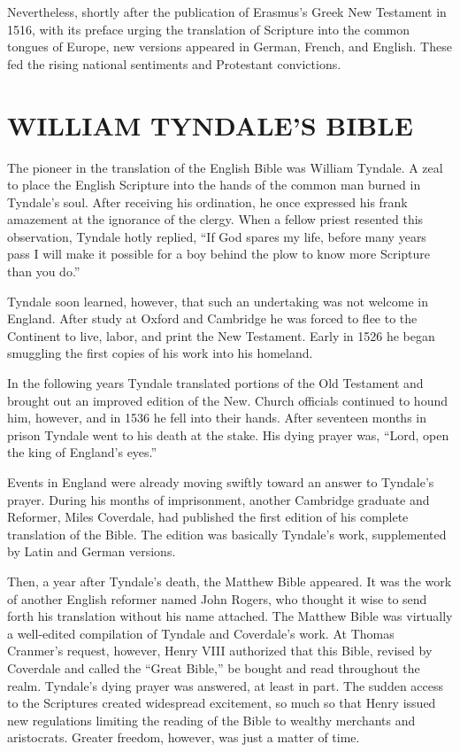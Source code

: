 Nevertheless, shortly after the publication of Erasmus’s Greek New Testament in 1516, with its
preface urging the translation of Scripture into the common tongues of Europe, new versions appeared
in German, French, and English. These fed the rising national sentiments and Protestant convictions.

\section{WILLIAM TYNDALE’S BIBLE}

The pioneer in the translation of the English Bible was William Tyndale. A zeal to place the English
Scripture into the hands of the common man burned in Tyndale’s soul. After receiving his ordination,
he once expressed his frank amazement at the ignorance of the clergy. When a fellow priest resented
this observation, Tyndale hotly replied, “If God spares my life, before many years pass I will make
it possible for a boy behind the plow to know more Scripture than you do.”

Tyndale soon learned, however, that such an undertaking was not welcome in England. After study at
Oxford and Cambridge he was forced to flee to the Continent to live, labor, and print the New
Testament. Early in 1526 he began smuggling the first copies of his work into his homeland.

In the following years Tyndale translated portions of the Old Testament and brought out an improved
edition of the New. Church officials continued to hound him, however, and in 1536 he fell into their
hands. After seventeen months in prison Tyndale went to his death at the stake. His dying prayer
was, “Lord, open the king of England’s eyes.”

Events in England were already moving swiftly toward an answer to Tyndale’s prayer. During his
months of imprisonment, another Cambridge graduate and Reformer, Miles Coverdale, had published the
first edition of his complete translation of the Bible. The edition was basically Tyndale’s work,
supplemented by Latin and German versions.

Then, a year after Tyndale’s death, the Matthew Bible appeared. It was the work of another English
reformer named John Rogers, who thought it wise to send forth his translation without his name
attached. The Matthew Bible was virtually a well-edited compilation of Tyndale and Coverdale’s work.
At Thomas Cranmer’s request, however, Henry VIII authorized that this Bible, revised by Coverdale
and called the “Great Bible,” be bought and read throughout the realm. Tyndale’s dying prayer was
answered, at least in part. The sudden access to the Scriptures created widespread excitement, so
much so that Henry issued new regulations limiting the reading of the Bible to wealthy merchants and
aristocrats. Greater freedom, however, was just a matter of time.

